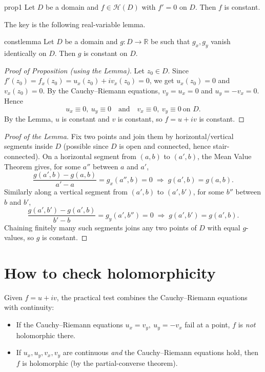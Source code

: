 \documentclass[11pt,openany]{report}
\newcommand{\R}{\mathbb{R}}
\newcommand{\Hol}{\mathcal{H}}
\begin{document}
\begin{propos}{}{prop1}
Let $D$ be a domain and $f\in\Hol(D)$ with $f'=0$ on $D$. Then $f$ is constant.
\end{propos}

The key is the following real-variable lemma.

\begin{lemma}{}{constlemma}
Let $D$ be a domain and $g:D\to\R$ be such that $g_x,g_y$ vanish identically on $D$. Then
$g$ is constant on $D$.
\end{lemma}

\begin{proof}[Proof of Proposition (using the Lemma)]
Let $z_0\in D$. Since $f'(z_0)=f_x(z_0)=u_x(z_0)+i v_x(z_0)=0$, we get
$u_x(z_0)=0$ and $v_x(z_0)=0$. By the Cauchy--Riemann equations,
$v_y = u_x = 0$ and $u_y = -v_x = 0$. Hence
\[
  u_x\equiv0,\ u_y\equiv0 \quad\text{and}\quad v_x\equiv0,\ v_y\equiv0 \ \text{on } D.
\]
By the Lemma, $u$ is constant and $v$ is constant, so $f=u+iv$ is constant.
\end{proof}

\begin{proof}[Proof of the Lemma]
Fix two points and join them by horizontal/vertical segments inside $D$ (possible since
$D$ is open and connected, hence stair-connected). On a horizontal segment from
$(a,b)$ to $(a',b)$, the Mean Value Theorem gives, for some $a''$ between $a$ and $a'$,
\[
  \frac{g(a',b)-g(a,b)}{a'-a} = g_x(a'',b) = 0
  \;\Longrightarrow\; g(a',b) = g(a,b).
\]
Similarly along a vertical segment from $(a',b)$ to $(a',b')$, for some $b''$ between
$b$ and $b'$,
\[
  \frac{g(a',b')-g(a',b)}{b'-b} = g_y(a',b'') = 0
  \;\Longrightarrow\; g(a',b') = g(a',b).
\]
Chaining finitely many such segments joins any two points of $D$ with equal $g$-values, so
$g$ is constant.
\end{proof}

\section{How to check holomorphicity}

Given $f=u+iv$, the practical test combines the Cauchy--Riemann equations with continuity:
\begin{itemize}[leftmargin=1.4em]
  \item If the Cauchy--Riemann equations $u_x=v_y,\ u_y=-v_x$ fail at a point, $f$ is
        \emph{not} holomorphic there.
  \item If $u_x,u_y,v_x,v_y$ are continuous \emph{and} the Cauchy--Riemann equations hold,
        then $f$ is holomorphic (by the partial-converse theorem).
\end{itemize}
\end{document}
